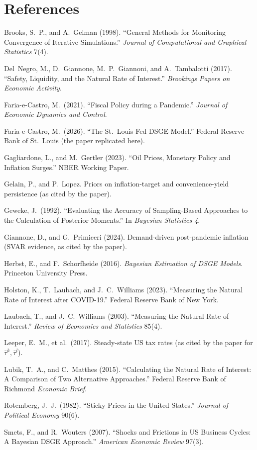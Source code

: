 \documentclass[11pt]{article}
\theoremstyle{definition}
\begin{document}
\section*{References}\label{sec:refs}
\begin{footnotesize}
\begin{list}{}{\setlength{\itemindent}{-\leftmargin}\setlength{\itemsep}{2pt}}
\item Brooks, S.\ P., and A.\ Gelman (1998). ``General Methods for Monitoring Convergence of Iterative
Simulations.'' \emph{Journal of Computational and Graphical Statistics} 7(4).
\item Del~Negro, M., D.\ Giannone, M.\ P.\ Giannoni, and A.\ Tambalotti (2017). ``Safety, Liquidity, and
the Natural Rate of Interest.'' \emph{Brookings Papers on Economic Activity}.
\item Faria-e-Castro, M.\ (2021). ``Fiscal Policy during a Pandemic.'' \emph{Journal of Economic
Dynamics and Control}.
\item Faria-e-Castro, M.\ (2026). ``The St.\ Louis Fed DSGE Model.'' Federal Reserve Bank of St.\ Louis
(the paper replicated here).
\item Gagliardone, L., and M.\ Gertler (2023). ``Oil Prices, Monetary Policy and Inflation Surges.''
NBER Working Paper.
\item Gelain, P., and P.\ Lopez. Priors on inflation-target and convenience-yield persistence (as cited
by the paper).
\item Geweke, J.\ (1992). ``Evaluating the Accuracy of Sampling-Based Approaches to the Calculation of
Posterior Moments.'' In \emph{Bayesian Statistics 4}.
\item Giannone, D., and G.\ Primiceri (2024). Demand-driven post-pandemic inflation (SVAR evidence, as
cited by the paper).
\item Herbst, E., and F.\ Schorfheide (2016). \emph{Bayesian Estimation of DSGE Models}. Princeton
University Press.
\item Holston, K., T.\ Laubach, and J.\ C.\ Williams (2023). ``Measuring the Natural Rate of Interest
after COVID-19.'' Federal Reserve Bank of New York.
\item Laubach, T., and J.\ C.\ Williams (2003). ``Measuring the Natural Rate of Interest.'' \emph{Review
of Economics and Statistics} 85(4).
\item Leeper, E.\ M., et al.\ (2017). Steady-state US tax rates (as cited by the paper for
$\bar\tau^k,\bar\tau^l$).
\item Lubik, T.\ A., and C.\ Matthes (2015). ``Calculating the Natural Rate of Interest: A Comparison of
Two Alternative Approaches.'' Federal Reserve Bank of Richmond \emph{Economic Brief}.
\item Rotemberg, J.\ J.\ (1982). ``Sticky Prices in the United States.'' \emph{Journal of Political
Economy} 90(6).
\item Smets, F., and R.\ Wouters (2007). ``Shocks and Frictions in US Business Cycles: A Bayesian DSGE
Approach.'' \emph{American Economic Review} 97(3).
\end{list}
\end{footnotesize}
\end{document}
